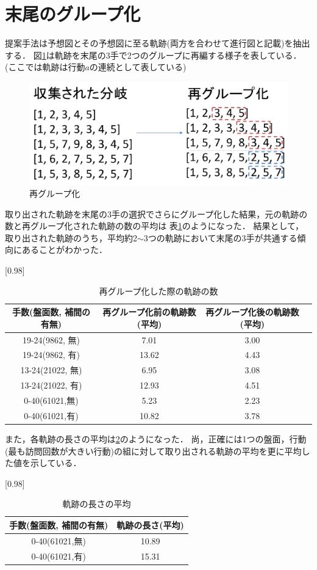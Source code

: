 \section{末尾のグループ化}
提案手法は予想図とその予想図に至る軌跡(両方を合わせて進行図と記載)を抽出する．
図\ref{fig:regroup}は軌跡を末尾の3手で2つのグループに再編する様子を表している．(ここでは軌跡は行動$a$の連続として表している)
\begin{figure}[t]
	\centering
	\includegraphics[width=\linewidth]{./figure/regroup.pdf}
	\caption{再グループ化}
	\label{fig:regroup}
\end{figure}
取り出された軌跡を末尾の3手の選択でさらにグループ化した結果，元の軌跡の数と再グループ化された軌跡の数の平均は
表\ref{table:tail}のようになった．
結果として，取り出された軌跡のうち，平均約2$\sim$3つの軌跡において末尾の3手が共通する傾向にあることがわかった．
\begin{table}[H]
	\caption{再グループ化した際の軌跡の数}
    \scriptsize
    \label{table:tail}
	\centering
	\scalebox{0.98}[0.98]{
		\begin{tabular}{c|c|c||c}
			手数(盤面数, 補間の有無)&  再グループ化前の軌跡数(平均)&  再グループ化後の軌跡数(平均)\\ \hline
			19-24(9862, 無)    & 7.01 & 3.00  \\
			19-24(9862, 有)    & 13.62 & 4.43  \\
			13-24(21022, 無)   &  6.95& 3.08  \\
			13-24(21022, 有)   & 12.93 & 4.51 \\
		    0-40(61021,無)& 5.23 & 2.23\\
		    0-40(61021,有)& 10.82 & 3.78\\
		\end{tabular}
	}

	
\end{table}
また，各軌跡の長さの平均は\ref{fig:length}のようになった．
尚，正確には1つの盤面，行動(最も訪問回数が大きい行動)の組に対して取り出される軌跡の平均を更に平均した値を示している．
\begin{table}[H]
	\caption{軌跡の長さの平均}
    \scriptsize
    \label{fig:length}
	\centering
	\scalebox{0.98}[0.98]{
		\begin{tabular}{c|c}
			手数(盤面数, 補間の有無)&  軌跡の長さ(平均)\\ \hline
		    0-40(61021,無)& 10.89\\
		    0-40(61021,有)& 15.31\\
		\end{tabular}
	}	
\end{table}

